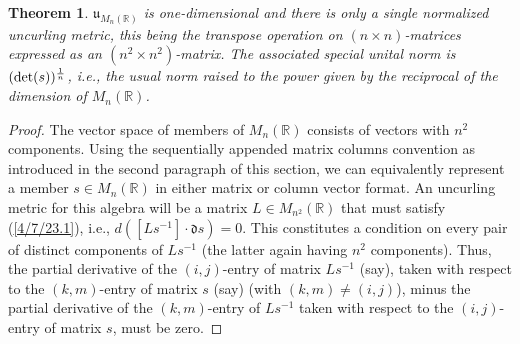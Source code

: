 \documentclass{amsart}
\numberwithin{equation}{section}
\newtheorem{theorem}{Theorem}
\theoremstyle{definition}
\numberwithin{theorem}{section}
\begin{document}
 \begin{theorem} \label{4/8/22.1} $\mathfrak{u}_{M_n(\mathbb{R})}$ is one-dimensional and there is only a single normalized uncurling metric, this being the  transpose operation on $(n\times n)$-matrices expressed as an $(n^2\times n^2)$-matrix. The associated special unital norm is $({\rm det}(s))^{\frac{1}{n}}$, i.e., the usual norm raised to the power given by the reciprocal of the dimension of $M_n(\mathbb{R})$. \end{theorem}
 \begin{proof} The vector space of members of $ M_n(\mathbb{R})$ consists of  vectors with $n^2$ components.   Using the sequentially appended matrix columns convention as introduced in the second paragraph of this section, we can equivalently represent a member $s\in M_n(\mathbb{R})$ in either matrix or column vector format.   An uncurling metric for this algebra will be a matrix $L\in M_{n^2}(\mathbb{R})$ that must satisfy (\ref{4/7/23.1}), i.e., $d\left([Ls^{-1}]\cdot \mathfrak{d}s\right)=0$. This constitutes a condition on every pair of distinct components of $Ls^{-1}$ (the latter again having $n^2$ components).  Thus,  the partial derivative of the  $(i,j)$-entry of matrix $Ls^{-1}$ (say), taken with respect to the $(k,m)$-entry of matrix $s$ (say) (with $(k,m)\ne (i,j)$),  minus  the partial derivative of the $(k,m)$-entry of $Ls^{-1}$  taken with respect to the $(i,j)$-entry of matrix $s$, must be zero.
 

\end{proof}
\end{document}
